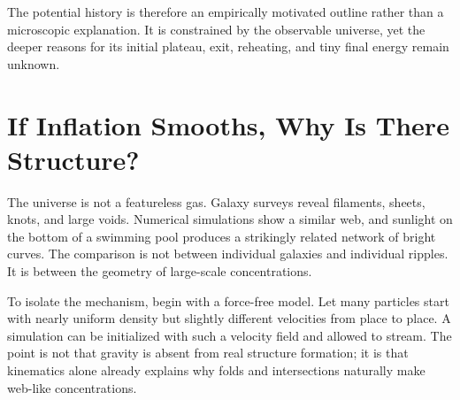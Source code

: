 \begin{classroomqa}
\end{classroomqa}

\begin{classroomqa}
\end{classroomqa}

The potential history is therefore an empirically motivated outline rather than a microscopic explanation. It is constrained by the observable universe, yet the deeper reasons for its initial plateau, exit, reheating, and tiny final energy remain unknown.

\section{If Inflation Smooths, Why Is There Structure?}

The universe is not a featureless gas. Galaxy surveys reveal filaments, sheets, knots, and large voids. Numerical simulations show a similar web, and sunlight on the bottom of a swimming pool produces a strikingly related network of bright curves. The comparison is not between individual galaxies and individual ripples. It is between the geometry of large-scale concentrations.

To isolate the mechanism, begin with a force-free model. Let many particles start with nearly uniform density but slightly different velocities from place to place. A simulation can be initialized with such a velocity field and allowed to stream. The point is not that gravity is absent from real structure formation; it is that kinematics alone already explains why folds and intersections naturally make web-like concentrations.

